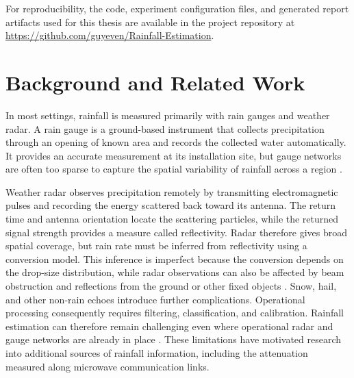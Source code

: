 \documentclass[11pt]{article}
\newcommand{\cleartorecto}{%
  \clearpage
  \ifodd\value{page}
  \else
    \thispagestyle{empty}
    \null
    \clearpage
  \fi
}
\begin{document}
For reproducibility, the code, experiment configuration files, and generated report artifacts used for this thesis are available in the project repository at \url{https://github.com/guyeven/Rainfall-Estimation}.

\cleartorecto
\section{Background and Related Work}
In most settings, rainfall is measured primarily with rain gauges and weather radar. A rain gauge is a ground-based instrument that collects precipitation through an opening of known area and records the collected water automatically. It provides an accurate measurement at its installation site, but gauge networks are often too sparse to capture the spatial variability of rainfall across a region \citep{mckee2015gaugeradar}.

Weather radar observes precipitation remotely by transmitting electromagnetic pulses and recording the energy scattered back toward its antenna. The return time and antenna orientation locate the scattering particles, while the returned signal strength provides a measure called reflectivity. Radar therefore gives broad spatial coverage, but rain rate must be inferred from reflectivity using a conversion model. This inference is imperfect because the conversion depends on the drop-size distribution, while radar observations can also be affected by beam obstruction and reflections from the ground or other fixed objects \citep{graf2020germanwide}. Snow, hail, and other non-rain echoes introduce further complications. Operational processing consequently requires filtering, classification, and calibration. Rainfall estimation can therefore remain challenging even where operational radar and gauge networks are already in place \citep{olsson2025societal}. These limitations have motivated research into additional sources of rainfall information, including the attenuation measured along microwave communication links.
\end{document}
